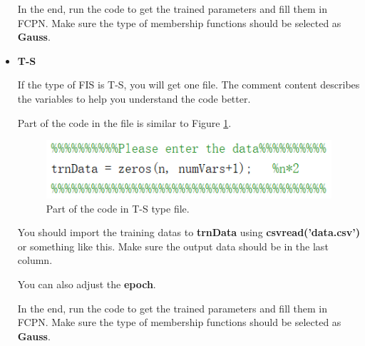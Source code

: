 \documentclass[journal,a4paper,onecolumn]{article}
\begin{document}
\begin{itemize}
	In the end, run the code to get the trained parameters and fill them in FCPN. Make sure the type of membership functions should be selected as \textbf{Gauss}.

	\item \textbf{T-S}
	
	If the type of FIS is T-S, you will get one file. The comment content describes the variables to help you understand the code better.
	
	Part of the code in the file is similar to Figure \ref{fig:Part of the code in T-S type file.}.
	\begin{figure}[!hbt]
		\begin{center}
			\includegraphics[width=\columnwidth]{fig63}
			\caption{Part of the code in T-S type file.}
			\label{fig:Part of the code in T-S type file.}
		\end{center}
	\end{figure}

	You should import the training datas to \textbf{trnData} using \textbf{csvread('data.csv')} or something like this. Make sure the output data should be in the last column. 
	
	You can also adjust the \textbf{epoch}.
	
	In the end, run the code to get the trained parameters and fill them in FCPN. Make sure the type of membership functions should be selected as \textbf{Gauss}.
	
\end{itemize}
\clearpage


 
\end{document}
